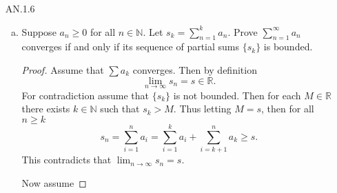 \documentclass[12pt]{article}
\begin{document}
\begin{enumerate}
\begin{enumerate}[(a)]
\begin{proof}
\begin{equation*}
                        \end{equation*}
                        Since $HK\subseteq G$, then $|HK|\leq 36$ which implies
                        that $|H\cap K|\geq 3$. Also note that the normalizer
                        $N(H\cap K)$ includes $H$ and $K$ and since these are
                        both distinct groups of order 9, then $N(H\cap K)$ must
                        have at least 18 elements. Moreover, since $N(H\cap
                        K)\leq G$, then its order must divide 36. Thus
                        $|N(H\cap K)|=18$ or $|N(H\cap K)|=36$. If it is 18,
                        then it has index 2 in $G$ any is thus a normal
                        subgroup. If it has order $36$, then $N(H\cap K)=G$
                        which implies that $H\cap K$ is normal in $G$.
                        Therefore $G$ is not simple. 
                    \end{proof}
            \end{enumerate}
        \item[AN.1.6]\hfill\par
            \begin{enumerate}[(a)]
                \item Suppose $a_n\geq 0$ for all $n\in\mathbb{N}$. Let
                    $s_k=\sum_{n=1}^{k}a_n$. Prove $\sum_{n=1}^{\infty}a_n$
                    converges if and only if its sequence of partial sums
                    $\{s_k\}$ is bounded. 
                    \begin{proof}
                        Assume that $\sum a_k$ converges. Then by definition
                        \begin{equation*}
                            \lim_{n\to\infty}s_n=s\in\mathbb{R}.
                        \end{equation*}
                        For contradiction assume that $\{s_k\}$ is not bounded.
                        Then for each $M\in\mathbb{R}$ there exists
                        $k\in\mathbb{N}$ such that $s_k>M$. Thus letting $M=s$,
                        then for all $n\geq k$
                        \begin{equation*}
                            s_n=\sum_{i=1}^n a_i=\sum_{i=1}^k a_i+\sum_{i=k+1}^
                            n a_k\geq s.
                        \end{equation*}
                        This contradicts that
                        $\lim_{n\to\infty}s_n=s$.\par\hspace{4mm} Now assume

\end{proof}
\end{enumerate}
\end{enumerate}
\end{document}

